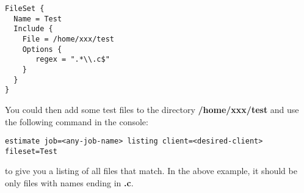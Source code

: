 \footnotesize
\begin{verbatim}
FileSet {
  Name = Test
  Include {
    File = /home/xxx/test
    Options {
       regex = ".*\\.c$"
    }
  }
}
\end{verbatim}
\normalsize

You could then add some test files to the directory {\bf /home/xxx/test}
and use the following command in the console:

\footnotesize
\begin{verbatim}
estimate job=<any-job-name> listing client=<desired-client> fileset=Test
\end{verbatim}
\normalsize

to give you a listing of all files that match.  In the above
example, it should be only files with names ending in  {\bf .c}.
